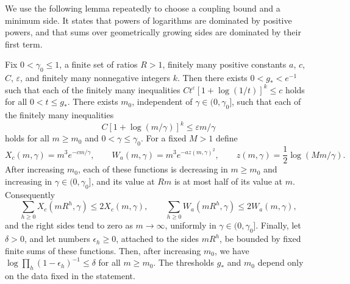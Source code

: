 We use the following lemma repeatedly to choose a coupling bound and a minimum side. It states that powers of logarithms are dominated by positive powers, and that sums over geometrically growing sides are dominated by their first term.

\begin{lemma}\label{ch20:lem:scalar-gates}
Fix $0<\gamma_0\le1$, a finite set of ratios $R>1$, finitely many positive constants $a$, $c$, $C$, $\varepsilon$, and finitely many nonnegative integers $k$. Then there exists $0<g_*<e^{-1}$ such that each of the finitely many inequalities $Ct^\varepsilon[1+\log(1/t)]^k\le c$ holds for all $0<t\le g_*$. There exists $m_0$, independent of $\gamma\in(0,\gamma_0]$, such that each of the finitely many inequalities
\[
 C[1+\log(m/\gamma)]^k\le\varepsilon m/\gamma
\]
holds for all $m\ge m_0$ and $0<\gamma\le\gamma_0$. For a fixed $M>1$ define
\[
 X_c(m,\gamma)=m^3e^{-cm/\gamma},\qquad
 W_a(m,\gamma)=m^3e^{-az(m,\gamma)^2},\qquad
 z(m,\gamma)=\frac12\log(Mm/\gamma).
\]
After increasing $m_0$, each of these functions is decreasing in $m\ge m_0$ and increasing in $\gamma\in(0,\gamma_0]$, and its value at $Rm$ is at most half of its value at $m$. Consequently
\[
 \sum_{h\ge0}X_c(mR^h,\gamma)\le2X_c(m,\gamma),\qquad
 \sum_{h\ge0}W_a(mR^h,\gamma)\le2W_a(m,\gamma),
\]
and the right sides tend to zero as $m\to\infty$, uniformly in $\gamma\in(0,\gamma_0]$. Finally, let $\delta>0$, and let numbers $\epsilon_h\ge0$, attached to the sides $mR^h$, be bounded by fixed finite sums of these functions. Then, after increasing $m_0$, we have $\log\prod_h(1-\epsilon_h)^{-1}\le\delta$ for all $m\ge m_0$. The thresholds $g_*$ and $m_0$ depend only on the data fixed in the statement.
\end{lemma}

